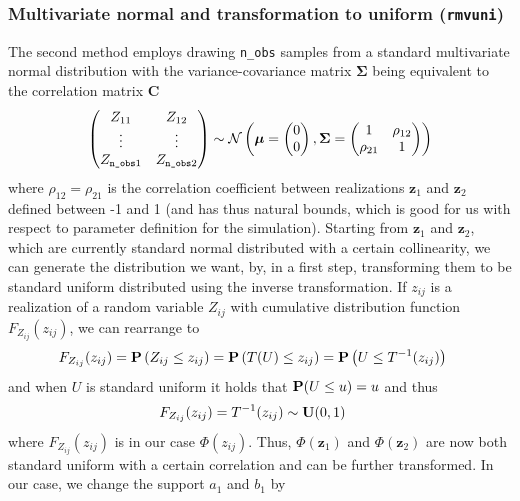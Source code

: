\documentclass[11pt,a4paper,twoside]{book}\usepackage[]{graphicx}\usepackage[]{xcolor}
\begin{document}
\subsubsection{Multivariate normal and transformation to uniform (\texttt{rmvuni})}\label{section:mvt}
The second method employs drawing \texttt{n\_obs} samples from a standard multivariate normal distribution with the variance-covariance matrix $\boldsymbol{\Sigma}$ being equivalent to the correlation matrix $\boldsymbol{C}$
\begin{align}
\begin{pmatrix}
  Z_{11} & Z_{12} \\
  \vdots & \vdots \\
  Z_{\texttt{n\_obs}1} & Z_{\texttt{n\_obs}2}
\end{pmatrix}
\sim
\operatorname{\mathcal{N}}\left(\boldsymbol{\mu} = \begin{pmatrix}
  0  \\ 0
\end{pmatrix},
\boldsymbol{\Sigma} = \begin{pmatrix}
  1 & \rho_{12} \\
  \rho_{21} & 1
\end{pmatrix}\right)
\label{eq:rmv}
\end{align}
where $\rho_{12}=\rho_{21}$ is the correlation coefficient between realizations $\boldsymbol{z}_1$ and $\boldsymbol{z}_2$ defined between -1 and 1 (and has thus natural bounds, which is good for us with respect to parameter definition for the simulation). Starting from $\boldsymbol{z}_1$ and $\boldsymbol{z}_2$, which are currently standard normal distributed with a certain collinearity, we can generate the distribution we want, by, in a first step, transforming them to be standard uniform distributed using the inverse transformation. If $z_{ij}$ is a realization of a random variable $Z_{ij}$ with cumulative distribution function $F_{Z_{ij}}(z_{ij})$, we can rearrange to 
\begin{align*}
F_{Z_{ij}}(z_{ij})&={\mathbf{P}}\left(Z_{ij}\leq z_{ij}\right)={\mathbf{P}}\left(T(U)\leq z_{ij}\right)={\mathbf{P}}\left(U \leq T^{-1}(z_{ij})\right)
\end{align*}
and when $U$ is standard uniform it holds that ${\mathbf{P}}(U\leq u)=u$ and thus
\begin{align*}
F_{Z_{ij}}(z_{ij})&=T^{-1}(z_{ij})\sim {\mathbf{U}}(0,1)
\end{align*}
where $F_{Z_{ij}}(z_{ij})$ is in our case $\Phi(z_{ij})$. Thus, $\Phi\left(\boldsymbol{z}_1\right)$ and $\Phi\left(\boldsymbol{z}_2\right)$ are now both standard uniform with a certain correlation and can be further transformed. In our case, we change the support $a_1$ and $b_1$ by
\end{document}
